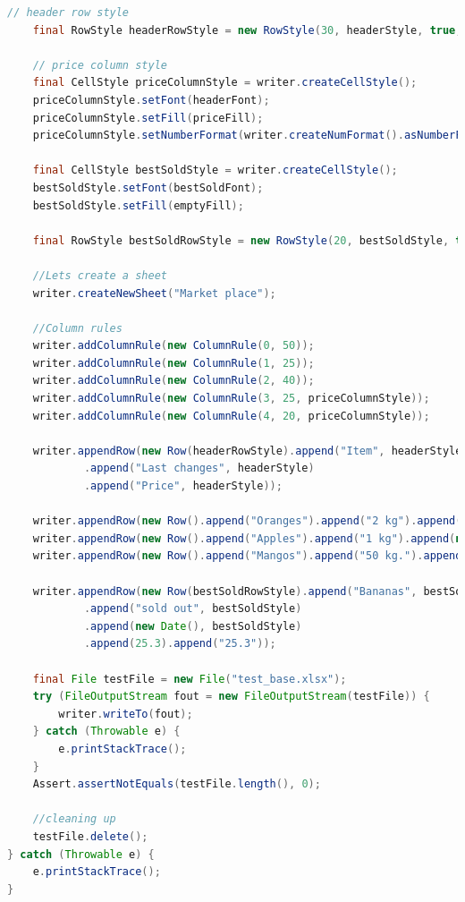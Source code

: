 \documentclass[14pt]{matmex-diploma-custom}
\begin{document}
\begin{lstlisting}[language=Java, style=basic, caption={Пример создания документа XLSX с форматированием с помощью библиотеки oxml-doc}, captionpos=b, label=java2]
    // header row style
    final RowStyle headerRowStyle = new RowStyle(30, headerStyle, true, true);

    // price column style
    final CellStyle priceColumnStyle = writer.createCellStyle();
    priceColumnStyle.setFont(headerFont);
    priceColumnStyle.setFill(priceFill);
    priceColumnStyle.setNumberFormat(writer.createNumFormat().asNumberFmt(2));

    final CellStyle bestSoldStyle = writer.createCellStyle();
    bestSoldStyle.setFont(bestSoldFont);
    bestSoldStyle.setFill(emptyFill);

    final RowStyle bestSoldRowStyle = new RowStyle(20, bestSoldStyle, true, true);
    
    //Lets create a sheet
    writer.createNewSheet("Market place");
    
    //Column rules
    writer.addColumnRule(new ColumnRule(0, 50));
    writer.addColumnRule(new ColumnRule(1, 25));
    writer.addColumnRule(new ColumnRule(2, 40));
    writer.addColumnRule(new ColumnRule(3, 25, priceColumnStyle));
    writer.addColumnRule(new ColumnRule(4, 20, priceColumnStyle));
    
    writer.appendRow(new Row(headerRowStyle).append("Item", headerStyle).append("Count", headerStyle)
            .append("Last changes", headerStyle)
            .append("Price", headerStyle));

    writer.appendRow(new Row().append("Oranges").append("2 kg").append(new Date()).append(10).append("10.0"));
    writer.appendRow(new Row().append("Apples").append("1 kg").append(new Date()).append(20).append("20.0"));
    writer.appendRow(new Row().append("Mangos").append("50 kg.").append(new Date()).append(30).append("30.0"));

    writer.appendRow(new Row(bestSoldRowStyle).append("Bananas", bestSoldStyle)
            .append("sold out", bestSoldStyle)
            .append(new Date(), bestSoldStyle)
            .append(25.3).append("25.3"));

    final File testFile = new File("test_base.xlsx");
    try (FileOutputStream fout = new FileOutputStream(testFile)) {
        writer.writeTo(fout);
    } catch (Throwable e) {
        e.printStackTrace();
    }
    Assert.assertNotEquals(testFile.length(), 0);

    //cleaning up
    testFile.delete();
} catch (Throwable e) {
    e.printStackTrace();
}
\end{lstlisting}
\setmonofont[Mapping=tex-text]{CMU Typewriter Text}


\end{document}
